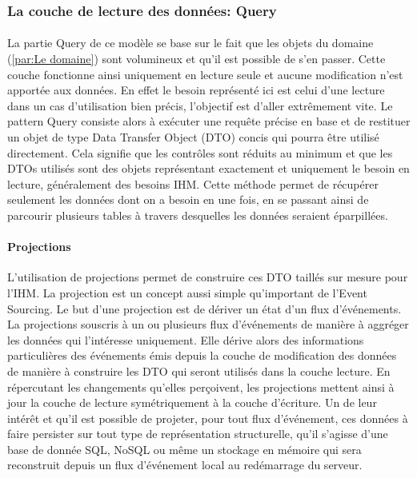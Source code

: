 \subsubsection{La couche de lecture des données: Query}
\label{subs:La couche de lecture des données: Query}
\paragraph{}
La partie Query de ce modèle se base sur le fait que les objets du domaine (\ref{par:Le domaine}) sont volumineux et qu'il est possible de s'en passer.
Cette couche fonctionne ainsi uniquement en lecture seule et aucune modification n'est apportée aux données.
En effet le besoin représenté ici est celui d'une lecture dans un cas d'utilisation bien précis, l'objectif est d'aller extrêmement vite.
Le pattern Query consiste alors à exécuter une requête précise en base et de restituer un objet de type Data Transfer Object (DTO) concis qui pourra être utilisé directement.
Cela signifie que les contrôles sont réduits au minimum et que les DTOs utilisés sont des objets représentant exactement et uniquement le besoin en lecture, généralement des besoins IHM.
Cette méthode permet de récupérer seulement les données dont on a besoin en une fois, en se passant ainsi de parcourir plusieurs tables à travers desquelles les données seraient éparpillées.
\paragraph{Projections}
L'utilisation de projections permet de construire ces DTO taillés sur mesure pour l'IHM.
La projection est un concept aussi simple qu'important de l'Event Sourcing.
Le but d'une projection est de dériver un état d'un flux d'événements.
La projections souscris à un ou plusieurs flux d'événements de manière à aggréger les données qui l'intéresse uniquement.
Elle dérive alors des informations particulières des événements émis depuis la couche de modification des données de manière à construire les DTO qui seront utilisés dans la couche lecture.
En répercutant les changements qu'elles perçoivent, les projections mettent ainsi à jour la couche de lecture symétriquement à la couche d'écriture.
Un de leur intérêt et qu'il est possible de projeter, pour tout flux d'événement, ces données à faire persister sur tout type de représentation structurelle, qu'il s'agisse d'une base de donnée SQL, NoSQL ou même un stockage en mémoire qui sera reconstruit depuis un flux d'événement local au redémarrage du serveur.
